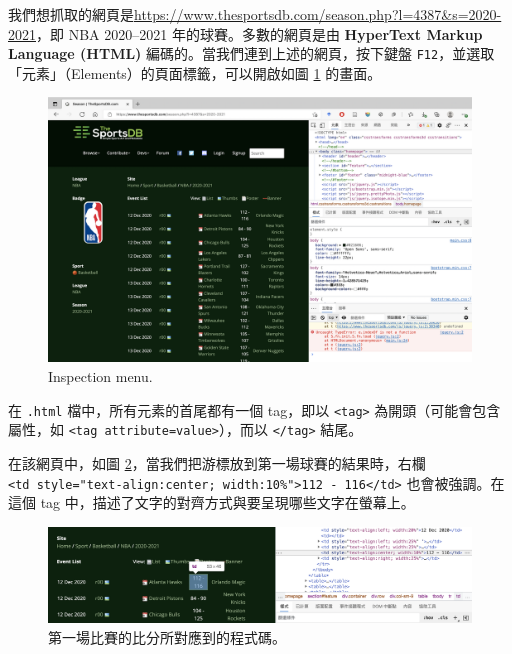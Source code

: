 \documentclass[
]{book}
\theoremstyle{definition}
\theoremstyle{remark}
\begin{document}
我們想抓取的網頁是\url{https://www.thesportsdb.com/season.php?l=4387\&s=2020-2021}，即 NBA 2020--2021 年的球賽。多數的網頁是由 \textbf{HyperText Markup Language (HTML)} 編碼的。當我們連到上述的網頁，按下鍵盤 \texttt{F12}，並選取「元素」（Elements）的頁面標籤，可以開啟如圖 \ref{fig:webscraping} 的畫面。

\begin{figure}

{\centering \includegraphics[width=650pt]{images/截圖 2021-07-21 上午12.26.50} 

}

\caption{Inspection menu.}\label{fig:webscraping}
\end{figure}

在 \texttt{.html} 檔中，所有元素的首尾都有一個 tag，即以 \texttt{\textless{}tag\textgreater{}} 為開頭（可能會包含屬性，如 \texttt{\textless{}tag\ attribute=value\textgreater{}}），而以 \texttt{\textless{}/tag\textgreater{}} 結尾。

在該網頁中，如圖 \ref{fig:tabletd}，當我們把游標放到第一場球賽的結果時，右欄 \texttt{\textless{}td\ style="text-align:center;\ width:10\%"\textgreater{}112\ -\ 116\textless{}/td\textgreater{}} 也會被強調。在這個 tag 中，描述了文字的對齊方式與要呈現哪些文字在螢幕上。

\begin{figure}

{\centering \includegraphics[width=650pt]{images/截圖 2021-07-21 上午1.25.09} 

}

\caption{第一場比賽的比分所對應到的程式碼。}\label{fig:tabletd}
\end{figure}
\end{document}
